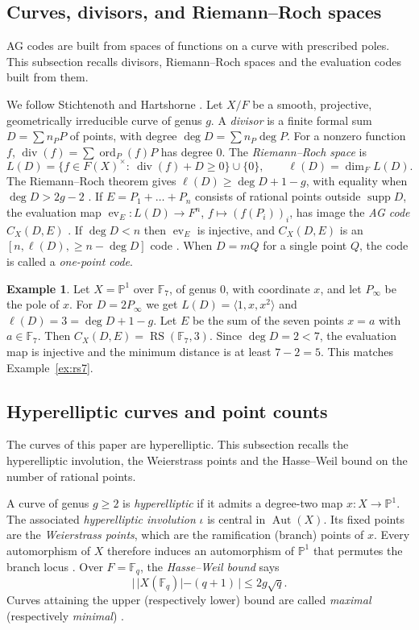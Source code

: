 \documentclass[12pt,letterpaper]{article}
\theoremstyle{definition}
\newtheorem{example}[theorem]{Example}
\theoremstyle{remark}
\numberwithin{equation}{section}
\newcommand{\F}{\mathbb{F}}
\newcommand{\PP}{\mathbb{P}}
\newcommand{\supp}{\operatorname{supp}}
\newcommand{\Aut}{\operatorname{Aut}}
\newcommand{\ev}{\operatorname{ev}}
\newcommand{\RS}{\operatorname{RS}}
\newcommand{\ord}{\operatorname{ord}}
\begin{document}
\subsection{Curves, divisors, and Riemann--Roch spaces}\label{subsec:bg-curves}
AG codes are built from spaces of functions on a curve with prescribed
poles. This subsection recalls divisors, Riemann--Roch spaces and the
evaluation codes built from them.

We follow Stichtenoth \cite{St93} and Hartshorne \cite{Ha77}.  Let $X/F$ be a
smooth, projective, geometrically irreducible curve of genus $g$.  A
\emph{divisor} is a finite formal sum $D=\sum n_PP$ of points, with
degree $\deg D=\sum n_P\deg P$.  For a nonzero function $f$,
$\operatorname{div}(f)=\sum\ord_P(f)P$ has degree $0$.  The
\emph{Riemann--Roch space} is
\[
L(D)=\{f\in F(X)^\times:\ \operatorname{div}(f)+D\ge0\}\cup\{0\},
\qquad \ell(D)=\dim_F L(D).
\]
The Riemann--Roch theorem gives $\ell(D)\ge\deg D+1-g$, with equality
when $\deg D>2g-2$ \cite[Thm.~I.5.17]{St93}.  If
$E=P_1+\dots+P_n$ consists of rational points outside $\supp D$, the
evaluation map $\ev_E:L(D)\to F^n$, $f\mapsto(f(P_i))_i$, has image the
\emph{AG code} $C_X(D,E)$ \cite{Go81,TVZ82}.  If $\deg D<n$ then $\ev_E$ is
injective, and $C_X(D,E)$ is an $[n,\ell(D),\ge n-\deg D]$ code
\cite[Thm.~II.2.2]{St93}.  When $D=mQ$ for a single point $Q$, the code is
called a \emph{one-point code}.

\begin{example}\label{ex:bg-p1}
Let $X=\PP^1$ over $\F_7$, of genus $0$, with coordinate $x$, and let
$P_\infty$ be the pole of $x$. For $D=2P_\infty$ we get
$L(D)=\langle1,x,x^2\rangle$ and $\ell(D)=3=\deg D+1-g$. Let $E$ be the
sum of the seven points $x=a$ with $a\in\F_7$. Then
$C_X(D,E)=\RS(\F_7,3)$. Since $\deg D=2<7$, the evaluation map is
injective and the minimum distance is at least $7-2=5$. This matches
Example~\ref{ex:rs7}.
\end{example}

\subsection{Hyperelliptic curves and point counts}\label{subsec:bg-hyper}
The curves of this paper are hyperelliptic. This subsection recalls the
hyperelliptic involution, the Weierstrass points and the Hasse--Weil
bound on the number of rational points.

A curve of genus $g\ge2$ is \emph{hyperelliptic} if it admits a degree-two
map $x:X\to\PP^1$.  The associated \emph{hyperelliptic involution}
$\iota$ is central in $\Aut(X)$.  Its fixed points are the
\emph{Weierstrass points}, which are the ramification (branch) points of
$x$.  Every automorphism of $X$ therefore induces an automorphism of
$\PP^1$ that permutes the branch locus \cite{BrS86,Go03}.  Over $F=\F_q$, the
\emph{Hasse--Weil bound} says
\[
|\,|X(\F_q)|-(q+1)\,|\le 2g\sqrt q.
\]
Curves attaining the upper (respectively lower) bound are called
\emph{maximal} (respectively \emph{minimal}) \cite[Thm.~V.2.3]{St93}.
\end{document}
